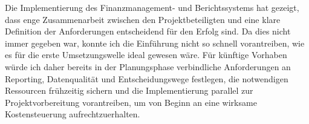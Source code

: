 \par Die Implementierung des Finanzmanagement- und Berichtssystems hat gezeigt, dass enge Zusammenarbeit zwischen den Projektbeteiligten und eine klare Definition der Anforderungen entscheidend für den Erfolg sind. Da dies nicht immer gegeben war, konnte ich die Einführung nicht so schnell vorantreiben, wie es für die erste Umsetzungswelle ideal gewesen wäre. Für künftige Vorhaben würde ich daher bereits in der Planungsphase verbindliche Anforderungen an Reporting, Datenqualität und Entscheidungswege festlegen, die notwendigen Ressourcen frühzeitig sichern und die Implementierung parallel zur Projektvorbereitung vorantreiben, um von Beginn an eine wirksame Kostensteuerung aufrechtzuerhalten.